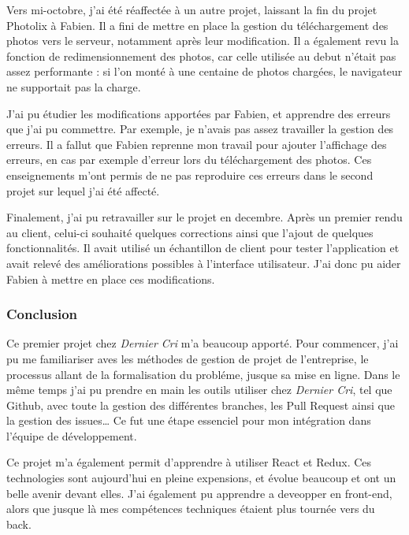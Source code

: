 \documentclass[12pt,a4paper]{article}
\begin{document}
  \bigskip

  Vers mi-octobre, j'ai été réaffectée à un autre projet, laissant la fin
  du projet Photolix à Fabien. Il a fini de mettre en place la gestion du
  téléchargement des photos vers le serveur, notamment après leur
  modification. Il a également revu la fonction de redimensionnement des
  photos, car celle utilisée au debut n'était pas assez performante : si
  l'on monté à une centaine de photos chargées, le navigateur ne
  supportait pas la charge.

  \bigskip

  J'ai pu étudier les modifications apportées par Fabien, et apprendre des
  erreurs que j'ai pu commettre. Par exemple, je n'avais pas assez
  travailler la gestion des erreurs. Il a fallut que Fabien reprenne mon
  travail pour ajouter l'affichage des erreurs, en cas par exemple
  d'erreur lors du téléchargement des photos. Ces enseignements m'ont
  permis de ne pas reproduire ces erreurs dans le second projet sur lequel
  j'ai été affecté.

  \bigskip

  Finalement, j'ai pu retravailler sur le projet en decembre. Après un
  premier rendu au client, celui-ci souhaité quelques corrections ainsi
  que l'ajout de quelques fonctionnalités. Il avait utilisé un échantillon
  de client pour tester l'application et avait relevé des améliorations
  possibles à l'interface utilisateur. J'ai donc pu aider Fabien à mettre
  en place ces modifications.

  \bigskip

  \subsubsection{Conclusion}\label{conclusion}

  \bigskip

  Ce premier projet chez \emph{Dernier Cri} m'a beaucoup apporté. Pour
  commencer, j'ai pu me familiariser aves les méthodes de gestion de
  projet de l'entreprise, le processus allant de la formalisation du
  probléme, jusque sa mise en ligne. Dans le même temps j'ai pu prendre en
  main les outils utiliser chez \emph{Dernier Cri}, tel que Github, avec
  toute la gestion des différentes branches, les Pull Request ainsi que la
  gestion des issues\ldots{} Ce fut une étape essenciel pour mon
  intégration dans l'équipe de développement.

  \bigskip

  Ce projet m'a également permit d'apprendre à utiliser React et Redux.
  Ces technologies sont aujourd'hui en pleine expensions, et évolue
  beaucoup et ont un belle avenir devant elles. J'ai également pu
  apprendre a deveopper en front-end, alors que jusque là mes compétences
  techniques étaient plus tournée vers du back.
\end{document}
